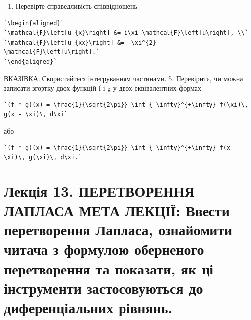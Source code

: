 \documentclass[
  ukrainian,
]{article}
\providecommand{\tightlist}{%
  \setlength{\itemsep}{0pt}\setlength{\parskip}{0pt}}
\begin{document}
\begin{enumerate}
\def\labelenumi{\arabic{enumi}.}
\setcounter{enumi}{3}
\tightlist
\item
  Перевірте справедливість співвідношень
\end{enumerate}

\begin{verbatim}
`\begin{aligned}`
`\mathcal{F}\left[u_{x}\right] &= i\xi \mathcal{F}\left[u\right], \\`
`\mathcal{F}\left[u_{xx}\right] &= -\xi^{2} \mathcal{F}\left[u\right].`
`\end{aligned}`
\end{verbatim}

ВКАЗІВКА. Скористайтеся інтегруванням частинами. 5. Перевірити, чи можна
записати згортку двох функцій f і g у двох еквівалентних формах

\begin{verbatim}
`(f * g)(x) = \frac{1}{\sqrt{2\pi}} \int_{-\infty}^{+\infty} f(\xi)\, g(x - \xi)\, d\xi`
\end{verbatim}

або

\begin{verbatim}
`(f * g)(x) = \frac{1}{\sqrt{2\pi}} \int_{-\infty}^{+\infty} f(x-\xi)\, g(\xi)\, d\xi.`
\end{verbatim}

\section{Лекція 13. ПЕРЕТВОРЕННЯ ЛАПЛАСА МЕТА ЛЕКЦІЇ: Ввести
перетворення Лапласа, ознайомити читача з формулою оберненого
перетворення та показати, як ці інструменти застосовуються до
диференціальних
рівнянь.}\label{ux43bux435ux43aux446ux456ux44f-13.-ux43fux435ux440ux435ux442ux432ux43eux440ux435ux43dux43dux44f-ux43bux430ux43fux43bux430ux441ux430-ux43cux435ux442ux430-ux43bux435ux43aux446ux456ux457-ux432ux432ux435ux441ux442ux438-ux43fux435ux440ux435ux442ux432ux43eux440ux435ux43dux43dux44f-ux43bux430ux43fux43bux430ux441ux430-ux43eux437ux43dux430ux439ux43eux43cux438ux442ux438-ux447ux438ux442ux430ux447ux430-ux437-ux444ux43eux440ux43cux443ux43bux43eux44e-ux43eux431ux435ux440ux43dux435ux43dux43eux433ux43e-ux43fux435ux440ux435ux442ux432ux43eux440ux435ux43dux43dux44f-ux442ux430-ux43fux43eux43aux430ux437ux430ux442ux438-ux44fux43a-ux446ux456-ux456ux43dux441ux442ux440ux443ux43cux435ux43dux442ux438-ux437ux430ux441ux442ux43eux441ux43eux432ux443ux44eux442ux44cux441ux44f-ux434ux43e-ux434ux438ux444ux435ux440ux435ux43dux446ux456ux430ux43bux44cux43dux438ux445-ux440ux456ux432ux43dux44fux43dux44c.}
\end{document}
